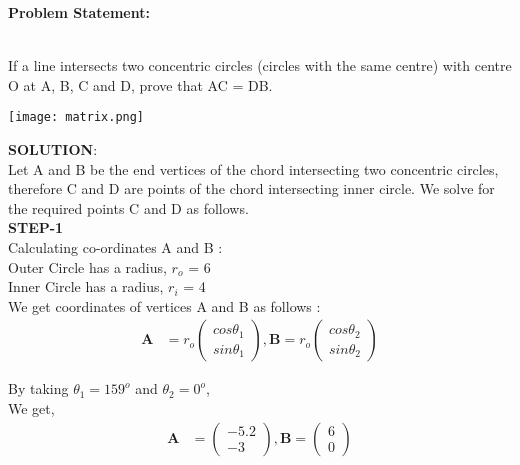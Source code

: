 \documentclass[10pt,a4paper]{report}
\newcommand{\myvec}[1]{\ensuremath{\begin{pmatrix}#1\end{pmatrix}}}
\let\vec\mathbf
\begin{document}
\begin{multicols}{2}

\raggedright \textbf{Problem Statement:}\vspace{2mm}
\raggedright \\If a line intersects two concentric circles (circles
with the same centre) with centre O at A, B, C and D, prove that AC = DB.
\vspace{5mm}

\begin{center}
\texttt{[image: matrix.png]}  
\end{center}\vspace{5mm}
\vspace{2mm}  

\raggedright \textbf{SOLUTION}:\vspace{2mm}\\
Let A and B be the end vertices of the chord intersecting two concentric circles, therefore C and D are points of the chord intersecting inner circle. We solve for the required points C and D as follows.\vspace{4mm}\\

\textbf{STEP-1}\vspace{2mm}\\
Calculating co-ordinates A and B : \vspace{2mm}\\ 
Outer Circle has a radius, $r_o$ = 6\vspace{2mm}\\ 
Inner Circle has a radius, $r_i$ = 4\vspace{2mm}\\
We get coordinates of vertices A and B as follows :\vspace{2mm}\\

\begin{align}
\vec{A} &= r_o\myvec{cos\theta_1 \\ sin\theta_1 }, \vec{B} = r_o\myvec{cos\theta_2  \\ sin\theta_2} 
\end{align}

\vspace{5.2mm} 
By taking $\theta_1 = 159^o$ and $\theta_2=0^o$, \vspace{2mm}\\
We get, 
\begin{align}
\vec{A} &= \myvec{-5.2 \\ -3}, \vec{B} = \myvec{6 \\ 0} 
\end{align}


\end{multicols}
\end{document}
